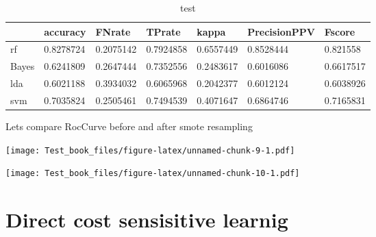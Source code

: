 \documentclass[
]{report}
\newenvironment{Shaded}{\begin{snugshade}}{\end{snugshade}}
\newcommand{\AttributeTok}[1]{\textcolor[rgb]{0.77,0.63,0.00}{#1}}
\newcommand{\DecValTok}[1]{\textcolor[rgb]{0.00,0.00,0.81}{#1}}
\newcommand{\FunctionTok}[1]{\textcolor[rgb]{0.00,0.00,0.00}{#1}}
\newcommand{\NormalTok}[1]{#1}
\newcommand{\SpecialCharTok}[1]{\textcolor[rgb]{0.00,0.00,0.00}{#1}}
\newcommand{\StringTok}[1]{\textcolor[rgb]{0.31,0.60,0.02}{#1}}
\begin{document}
\begin{table}

\caption{\label{tab:unnamed-chunk-8}test}
\centering
\begin{tabular}[t]{l|l|l|l|l|l|l}
\hline
  & accuracy & FNrate & TPrate & kappa & PrecisionPPV & Fscore\\
\hline
rf & 0.8278724 & 0.2075142 & 0.7924858 & 0.6557449 & 0.8528444 & 0.821558\\
\hline
Bayes & 0.6241809 & 0.2647444 & 0.7352556 & 0.2483617 & 0.6016086 & 0.6617517\\
\hline
lda & 0.6021188 & 0.3934032 & 0.6065968 & 0.2042377 & 0.6012124 & 0.6038926\\
\hline
svm & 0.7035824 & 0.2505461 & 0.7494539 & 0.4071647 & 0.6864746 & 0.7165831\\
\hline
\end{tabular}
\end{table}

Lets compare RocCurve before and after smote resampling

\texttt{[image: Test\_book\_files/figure-latex/unnamed-chunk-9-1.pdf]}

\begin{Shaded}
\end{Shaded}

\texttt{[image: Test\_book\_files/figure-latex/unnamed-chunk-10-1.pdf]}

\hypertarget{direct-cost-sensisitive-learnig}{%
\section{Direct cost sensisitive learnig}\label{direct-cost-sensisitive-learnig}}
\end{document}
